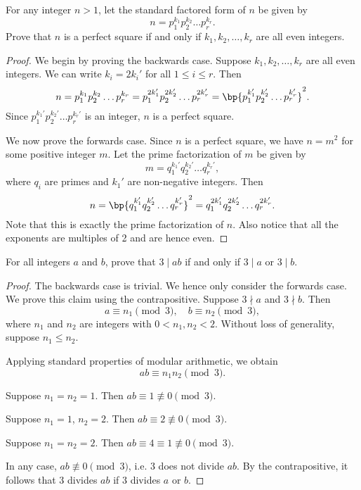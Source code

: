 \begin{problem}
    For any integer $n > 1$, let the standard factored form of $n$ be given by \[n = p_1^{k_1} p_2^{k_2} \dots p_{r}^{k_r}.\] Prove that $n$ is a perfect square if and only if $k_1, k_2, \dots, k_r$ are all even integers.
\end{problem}
\begin{solution}
    \begin{proof}
        We begin by proving the backwards case. Suppose $k_1, k_2, \dots, k_r$ are all even integers. We can write $k_i = 2k_i'$ for all $1 \leq i \leq r$. Then \[n = p_1^{k_1} p_2^{k_2} \dots p_{r}^{k_r} = p_1^{2k_1'} p_2^{2k_2'} \dots p_{r}^{2k_r'} = \bp{p_1^{k_1'} p_2^{k_2'} \dots p_{r}^{k_r'}}^2.\] Since $p_1^{k_1'} p_2^{k_2'} \dots p_{r}^{k_r'}$ is an integer, $n$ is a perfect square.

        We now prove the forwards case. Since $n$ is a perfect square, we have $n = m^2$ for some positive integer $m$. Let the prime factorization of $m$ be given by \[m = q_1^{k_1'} q_2^{k_2'} \dots q_{r}^{k_r'},\] where $q_i$ are primes and $k_1'$ are non-negative integers. Then \[n = \bp{q_1^{k_1'} q_2^{k_2'} \dots q_{r}^{k_r'}}^2 = q_1^{2k_1'} q_2^{2k_2'} \dots q_{r}^{2k_r'}.\] Note that this is exactly the prime factorization of $n$. Also notice that all the exponents are multiples of 2 and are hence even.
    \end{proof}
\end{solution}

\clearpage
\begin{problem}
    For all integers $a$ and $b$, prove that $3 \mid ab$ if and only if $3 \mid a$ or $3 \mid b$.
\end{problem}
\begin{solution}
    \begin{proof}
        The backwards case is trivial. We hence only consider the forwards case. We prove this claim using the contrapositive. Suppose $3 \nmid a$ and $3 \nmid b$. Then \[a \equiv n_1 \pmod{3}, \quad b \equiv n_2 \pmod{3},\] where $n_1$ and $n_2$ are integers with $0 < n_1, n_2 < 2$. Without loss of generality, suppose $n_1 \leq n_2$.
        
        Applying standard properties of modular arithmetic, we obtain \[ab \equiv n_1 n_2 \pmod{3}.\]

         Suppose $n_1 = n_2 = 1$. Then $ab \equiv 1 \not\equiv 0 \pmod{3}$.
        
         Suppose $n_1 = 1$, $n_2 = 2$. Then $ab \equiv 2 \not\equiv 0 \pmod{3}$.

         Suppose $n_1 = n_2 = 2$. Then $ab \equiv 4 \equiv 1 \not\equiv 0 \pmod{3}$.

        In any case, $ab \not\equiv 0 \pmod{3}$, i.e. 3 does not divide $ab$. By the contrapositive, it follows that 3 divides $ab$ if 3 divides $a$ or $b$.
    \end{proof}
\end{solution}

